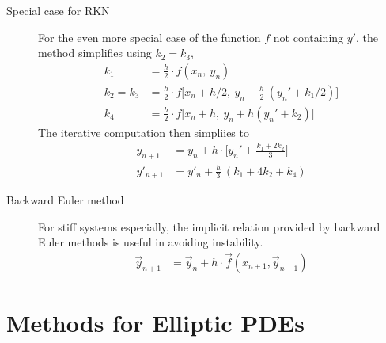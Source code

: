 \begin{description}
    \item[Special case for RKN] For the even more special case of the function
        $ f $ not containing $ y' $, the method simplifies using $ k_2 = k_3 $,
        \begin{align}
            k_1       & = \frac{h}{2} \cdot f(x_n,\ y_n)                              \\
            k_2 = k_3 & = \frac{h}{2} \cdot f\Bigg[ x_n + h/2,\ y_n
            + \frac{h}{2}\ (y_n' + k_1/2) \Bigg]                                      \\
            k_4       & = \frac{h}{2} \cdot f\Big[x_n + h,\ y_n + h (y_n' + k_2)\Big]
        \end{align}
        The iterative computation then simpliies to
        \begin{align}
            y_{n+1}  & = y_n + h \cdot \Bigg[y_n' + \frac{k_1 + 2k_2}{3}\Bigg] \\
            y'_{n+1} & = y'_n + \frac{h}{3}\ (k_1 + 4k_2 + k_4)
        \end{align}

    \item[Backward Euler method] For stiff systems especially, the implicit relation
        provided by backward Euler methods is useful in avoiding instability.
        \begin{align}
            \vec{y}_{n+1} & = \vec{y}_n + h \cdot \vec{f}(x_{n+1}, \vec{y}_{n+1})
        \end{align}
\end{description}

\section{Methods for Elliptic PDEs}

